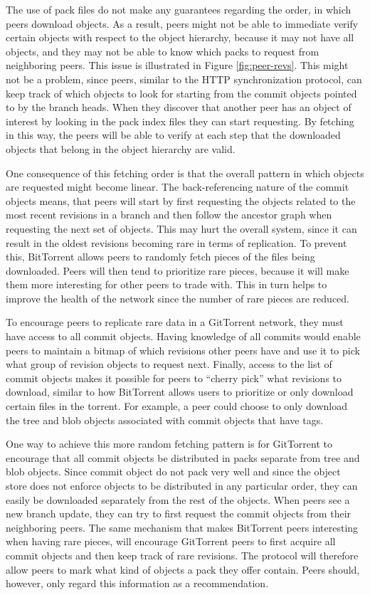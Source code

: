 The use of pack files do not make any guarantees regarding the order, in
which peers download objects. As a result, peers might not be able to
immediate verify certain objects with respect to the object hierarchy,
because it may not have all objects, and they may not be able to know
which packs to request from neighboring peers. This issue is
illustrated in Figure \ref{fig:peer-revs}.  This might not be a
problem, since peers, similar to the HTTP synchronization protocol, can keep track of
which objects to look for starting from the commit objects pointed to
by the branch heads. When they discover that another peer has an object of
interest by looking in the pack index files they can start requesting.
By fetching in this way, the peers will be able to verify at each step
that the downloaded objects that belong in the object hierarchy are
valid.

One consequence of this fetching order is that the overall pattern in which objects are
requested might become linear. The back-referencing nature of the
commit objects means, that peers will start by first requesting the objects related to
the most recent revisions in a branch and then follow the ancestor graph
when requesting the next set of objects. This may hurt the overall
system, since it can result in the oldest revisions becoming
rare in terms of replication. To prevent this, BitTorrent allows peers
to randomly fetch pieces of the files being downloaded. Peers will
then tend to prioritize rare pieces, because it will make them more
interesting for other peers to trade with. This in turn helps to
improve the health of the network since the number of rare pieces are reduced.

To encourage peers to replicate rare data in a GitTorrent network,
they must have access to all commit objects. Having knowledge of
all commits would enable peers to maintain a bitmap of which revisions
other peers have and use it to pick what group of revision objects to
request next. Finally, access to the list of commit objects makes it
possible for peers to ``cherry pick'' what revisions to download,
similar to how BitTorrent allows users to prioritize or only download
certain files in the torrent. For example, a peer could choose to only
download the tree and blob objects associated with commit objects
that have tags.

One way to achieve this more random fetching pattern is for GitTorrent
to encourage that all commit objects be distributed in packs separate
from tree and blob objects. Since commit object do not pack very well
and since the object store does not enforce objects to be distributed
in any particular order, they can easily be downloaded separately from
the rest of the objects. When peers see a new branch update, they can
try to first request the commit objects from their neighboring peers.
The same mechanism that makes BitTorrent peers interesting when having
rare pieces, will encourage GitTorrent peers to first acquire all
commit objects and then keep track of rare revisions. The protocol
will therefore allow peers to mark what kind of objects a pack they
offer contain. Peers should, however, only regard this information as
a recommendation.


